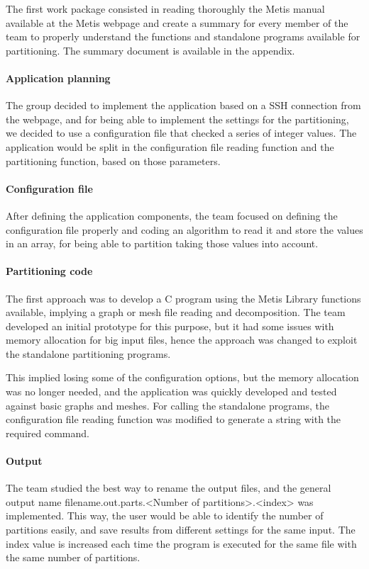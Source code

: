 \documentclass{cranfieldChart}
\begin{document}
The first work package consisted in reading thoroughly the Metis manual available at the Metis webpage and create a summary for every member of the team to properly understand the functions and standalone programs available for partitioning. The summary document is available in the appendix.

\paragraph{Application planning}
The group decided to implement the application based on a SSH connection from the webpage, and for being able to implement the settings for the partitioning, we decided to use a configuration file that checked a series of integer values. The application would be split in the configuration file reading function and the partitioning function, based on those parameters.

\paragraph{Configuration file}
After defining the application components, the team focused on defining the configuration file properly and coding an algorithm to read it and store the values in an array, for being able to partition taking those values into account.

\paragraph{Partitioning code}
The first approach was to develop a C program using the Metis Library functions available, implying a graph or mesh file reading and decomposition. The team developed an initial prototype for this purpose, but it had some issues with memory allocation for big input files, hence the approach was changed to exploit the standalone partitioning programs.

This implied losing some of the configuration options, but the memory allocation was no longer needed, and the application was quickly developed and tested against basic graphs and meshes. For calling the standalone programs, the configuration file reading function was modified to generate a string with the required command.

\paragraph{Output}
The team studied the best way to rename the output files, and the general output name filename.out.parts.<Number of partitions>.<index> was implemented. This way, the user would be able to identify the number of partitions easily, and save results from different settings for the same input. The index value is increased each time the program is executed for the same file with the same number of partitions.
\end{document}
